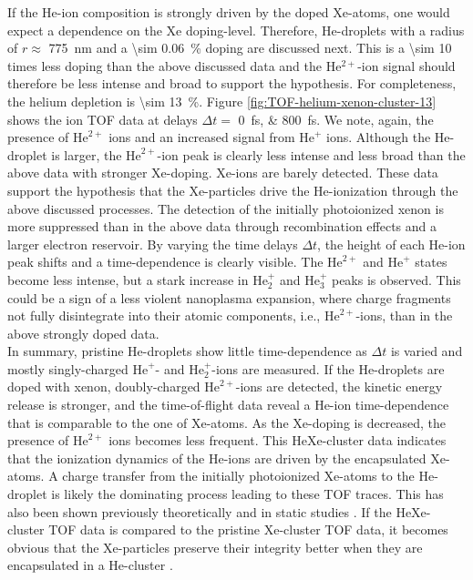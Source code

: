 If the He-ion composition is strongly driven by the doped Xe-atoms, one would expect a dependence on the Xe doping-level. Therefore, He-droplets with a radius of $r\approx$ \SI{775}{\nano\meter} and a \SI{\sim 0.06}{\percent} doping are discussed next. This is a \num{\sim 10} times less doping than the above discussed data and the He$^{2+}$-ion signal should therefore be less intense and broad to support the hypothesis. For completeness, the helium depletion is \SI{\sim 13}{\percent}. Figure \ref{fig:TOF-helium-xenon-cluster-13} shows the ion TOF data at delays $\Delta t=$ \SIlist{0;800}{\femto\second}. We note, again, the presence of $\text{He}^{2+}$ ions and an increased signal from $\text{He}^{+}$ ions. Although the He-droplet is larger, the $\text{He}^{2+}$-ion peak is clearly less intense and less broad than the above data with stronger Xe-doping. Xe-ions are barely detected. These data support the hypothesis that the Xe-particles drive the He-ionization through the above discussed processes. The detection of the initially photoionized xenon is more suppressed than in the above data through recombination effects and a larger electron reservoir. By varying the time delays $\Delta t$, the height of each He-ion peak shifts and a time-dependence is clearly visible. The $\text{He}^{2+}$ and $\text{He}^{+}$ states become less intense, but a stark increase in $\text{He}_{2}^{+}$ and $\text{He}_{3}^{+}$ peaks is observed. This could be a sign of a less violent nanoplasma expansion, where charge fragments not fully disintegrate into their atomic components, i.e., $\text{He}^{2+}$-ions, than in the above strongly doped data.\\[1\baselineskip]
%
In summary, pristine He-droplets show little time-dependence as $\Delta t$ is varied and mostly singly-charged $\text{He}^{+}$- and $\text{He}_{2}^{+}$-ions are measured. If the He-droplets are doped with xenon, doubly-charged $\text{He}^{2+}$-ions are detected, the kinetic energy release is stronger, and the time-of-flight data reveal a He-ion time-dependence that is comparable to the one of Xe-atoms. As the Xe-doping is decreased, the presence of $\text{He}^{2+}$ ions becomes less frequent. This HeXe-cluster data indicates that the ionization dynamics of the He-ions are driven by the encapsulated Xe-atoms. A charge transfer from the initially photoionized Xe-atoms to the He-droplet is likely the dominating process leading to these TOF traces. This has also been shown previously theoretically \cite{Hau-Riege-2007-PRL} and in static studies \cite{Hoener-2008-JPB,Sugishima-2012-PRA,Muller-2015-JPhysB}. If the HeXe-cluster TOF data is compared to the pristine Xe-cluster TOF data, it becomes obvious that the Xe-particles preserve their integrity better when they are encapsulated in a He-cluster \cite{Hoener-2008-JPB,Muller-2015-JPhysB,Sugishima-2012-PRA}.
